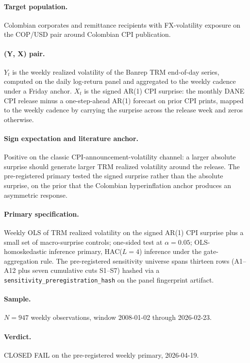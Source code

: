 \paragraph{Target population.} Colombian corporates and remittance
recipients with FX-volatility exposure on the COP/USD pair around
Colombian CPI publication.

\paragraph{(Y, X) pair.} \(Y_t\) is the weekly realized volatility of
the Banrep TRM end-of-day series, computed on the daily log-return
panel and aggregated to the weekly cadence under a Friday anchor.
\(X_t\) is the signed AR(1) CPI surprise: the monthly DANE CPI
release minus a one-step-ahead AR(1) forecast on prior CPI prints,
mapped to the weekly cadence by carrying the surprise across the
release week and zeros otherwise.

\paragraph{Sign expectation and literature anchor.} Positive on the
classic CPI-announcement-volatility channel: a larger absolute
surprise should generate larger TRM realized volatility around the
release. The pre-registered primary tested the signed surprise rather
than the absolute surprise, on the prior that the Colombian
hyperinflation anchor produces an asymmetric response.

\paragraph{Primary specification.} Weekly OLS of TRM realized
volatility on the signed AR(1) CPI surprise plus a small set of
macro-surprise controls; one-sided test at \(\alpha = 0.05\);
OLS-homoskedastic inference primary, HAC(\(L = 4\)) inference under
the gate-aggregation rule. The pre-registered sensitivity universe
spans thirteen rows (A1--A12 plus seven cumulative cuts S1--S7)
hashed via a \texttt{sensitivity\_preregistration\_hash} on the
panel fingerprint artifact.

\paragraph{Sample.} \(N = 947\) weekly observations, window
2008-01-02 through 2026-02-23.

\paragraph{Verdict.} CLOSED FAIL on the pre-registered weekly primary,
2026-04-19.

